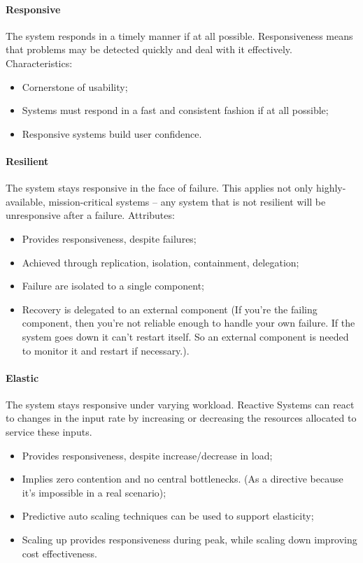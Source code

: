 \paragraph{Responsive}
The system responds in a timely manner if at all possible. Responsiveness means that problems may be detected quickly and deal with it effectively. 
Characteristics:
\begin{itemize}
    \item Cornerstone of usability;
    \item Systems must respond in a fast and consistent fashion if at all possible;
    \item Responsive systems build user confidence.
\end{itemize}

\paragraph{Resilient}
The system stays responsive in the face of failure. This applies not only highly-available, mission-critical systems -- any system that is not resilient will be unresponsive after a failure. Attributes:
\begin{itemize}
    \item Provides responsiveness, despite failures;
    \item Achieved through replication, isolation, containment, delegation;
    \item Failure are isolated to a single component;
    \item Recovery is delegated to an external component (If you're the failing component, then you're not reliable enough to handle your own failure. If the system goes down it can't restart itself. So an external component is needed to monitor it and restart if necessary.). 
\end{itemize}

\paragraph{Elastic}
The system stays responsive under varying workload. Reactive Systems can react to changes in the input rate by increasing or decreasing the resources allocated to service these inputs. 

\begin{itemize}
    \item Provides responsiveness, despite increase/decrease in load;
    \item Implies zero contention and no central bottlenecks. (As a directive because it's impossible in a real scenario);
    \item Predictive auto scaling techniques can be used to support elasticity;
    \item Scaling up provides responsiveness during peak, while scaling down improving cost effectiveness. 
\end{itemize}

